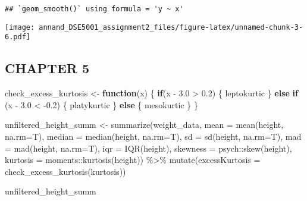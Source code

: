 \documentclass[
]{article}
\newenvironment{Shaded}{\begin{snugshade}}{\end{snugshade}}
\newcommand{\AttributeTok}[1]{\textcolor[rgb]{0.77,0.63,0.00}{#1}}
\newcommand{\ControlFlowTok}[1]{\textcolor[rgb]{0.13,0.29,0.53}{\textbf{#1}}}
\newcommand{\FloatTok}[1]{\textcolor[rgb]{0.00,0.00,0.81}{#1}}
\newcommand{\FunctionTok}[1]{\textcolor[rgb]{0.00,0.00,0.00}{#1}}
\newcommand{\NormalTok}[1]{#1}
\newcommand{\OtherTok}[1]{\textcolor[rgb]{0.56,0.35,0.01}{#1}}
\newcommand{\SpecialCharTok}[1]{\textcolor[rgb]{0.00,0.00,0.00}{#1}}
\newcommand{\StringTok}[1]{\textcolor[rgb]{0.31,0.60,0.02}{#1}}
\begin{document}
\begin{verbatim}
## `geom_smooth()` using formula = 'y ~ x'
\end{verbatim}

\texttt{[image: annand\_DSE5001\_assignment2\_files/figure-latex/unnamed-chunk-3-6.pdf]}

\hypertarget{chapter-5}{%
\subsection{CHAPTER 5}\label{chapter-5}}

\begin{Shaded}
\begin{Highlighting}[]
\NormalTok{check\_excess\_kurtosis }\OtherTok{\textless{}{-}} \ControlFlowTok{function}\NormalTok{(x) \{}
  \ControlFlowTok{if}\NormalTok{(x }\SpecialCharTok{{-}} \FloatTok{3.0} \SpecialCharTok{\textgreater{}} \FloatTok{0.2}\NormalTok{) \{}
  \StringTok{\textquotesingle{}leptokurtic\textquotesingle{}}
\NormalTok{\} }\ControlFlowTok{else} \ControlFlowTok{if}\NormalTok{ (x }\SpecialCharTok{{-}} \FloatTok{3.0} \SpecialCharTok{\textless{}} \SpecialCharTok{{-}}\FloatTok{0.2}\NormalTok{) \{}
  \StringTok{\textquotesingle{}platykurtic\textquotesingle{}}
\NormalTok{\} }\ControlFlowTok{else}\NormalTok{ \{}
  \StringTok{\textquotesingle{}mesokurtic\textquotesingle{}}
\NormalTok{\}}
\NormalTok{\}}

\NormalTok{unfiltered\_height\_summ }\OtherTok{\textless{}{-}} \FunctionTok{summarize}\NormalTok{(weight\_data, }\AttributeTok{mean =} \FunctionTok{mean}\NormalTok{(height, }\AttributeTok{na.rm=}\NormalTok{T), }\AttributeTok{median =} \FunctionTok{median}\NormalTok{(height, }\AttributeTok{na.rm=}\NormalTok{T), }\AttributeTok{sd =} \FunctionTok{sd}\NormalTok{(height, }\AttributeTok{na.rm=}\NormalTok{T), }\AttributeTok{mad =} \FunctionTok{mad}\NormalTok{(height, }\AttributeTok{na.rm=}\NormalTok{T), }\AttributeTok{iqr =} \FunctionTok{IQR}\NormalTok{(height), }\AttributeTok{skewness =}\NormalTok{ psych}\SpecialCharTok{::}\FunctionTok{skew}\NormalTok{(height), }\AttributeTok{kurtosis =}\NormalTok{ moments}\SpecialCharTok{::}\FunctionTok{kurtosis}\NormalTok{(height)) }\SpecialCharTok{\%\textgreater{}\%}
  \FunctionTok{mutate}\NormalTok{(}\AttributeTok{excessKurtosis =} \FunctionTok{check\_excess\_kurtosis}\NormalTok{(kurtosis))}

\NormalTok{unfiltered\_height\_summ}
\end{Highlighting}
\end{Shaded}
\end{document}
